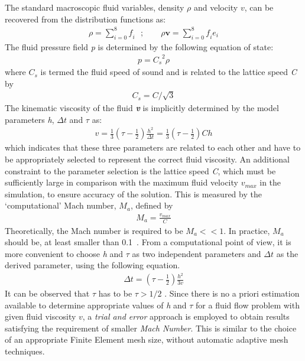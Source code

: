 The standard macroscopic fluid variables, density $\rho$ and velocity $\mathbf{\mathit{ v}}$, can be recovered from the distribution functions as:
\begin{align}
\rho = \sum\limits_{\mathit{i}=0}^{8}{\mathit{f_i}}\mbox{ }; \qquad \rho \mathbf{v} = \sum\limits_{\mathit{i}=0}^{8}{\mathit{f_i}}\mathbf{\mathit{e_i}}
\end{align}
The fluid pressure field \textit{p} is determined by the following equation of state:
\begin{align}
\mathit{p}=\mathit{C_s}^{2} \rho
\end{align}
where $\mathit{C_s}$ is termed the fluid speed of sound and is related to the lattice speed \textit{C} by
\begin{align}
\mathit{C_s}=\mathit{C}/\sqrt{3}
\end{align}
The kinematic viscosity of the fluid \textbf{\textit{v}} is implicitly determined by the model parameters \textit{h}, $\Delta \mathit{t}$ and $\tau$ as:
\begin{align}
\mathit{v}=\frac{1}{3}(\tau - \frac{1}{2})\frac{\mathit{h}^{2}}{\Delta \mathit{t}} = \frac{1}{3}(\tau - \frac{1}{2})\mathit{Ch}
\end{align}
which indicates that these three parameters are related to each other and have to be appropriately selected to represent the correct fluid viscosity. An additional constraint to the parameter selection is the lattice speed \textit{C}, which must be sufficiently large in comparison with the maximum fluid velocity $\mathit{v}_{\mathit{max}}$ in the simulation, to ensure accuracy of the solution. This is measured by the `computational' Mach number, $\mathit{M}_{\mathit{a}}$, defined by
\begin{align}
\mathit{M}_{\mathit{a}}=\frac{\mathit{v}_{\mathit{max}}}{\mathit{C}}
\end{align}
Theoretically, the Mach number is required to be $\mathit{M}_{\mathit{a}}<< 1$. In practice, $\mathit{M}_{\mathit{a}}$ should be, at least smaller than 0.1~\citep{He1997}. From a computational point of view, it is more convenient to choose \textit{h} and $\tau$ as two independent parameters and $\Delta \mathit{t}$ as the derived parameter, using the following equation.
\begin{align}
\Delta \mathit{t} = (\tau - \frac{1}{2}) \frac{h^{2}}{3\mathit{v}}
\end{align}
It can be observed that $\tau$ has to be $\tau > 1/2$ \citep{He1997}. Since there is no a priori estimation available to determine appropriate values of \textit{h} and $\tau$ for a fluid flow problem with given fluid viscosity $\mathit{v}$, a \textit{trial and error} approach is employed to obtain results satisfying the requirement of smaller \textit{Mach Number}. This is similar to the choice of an appropriate Finite Element mesh size, without automatic adaptive mesh techniques. 
